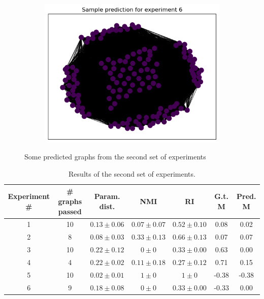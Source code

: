 \documentclass[switch, 12pt]{article}
\begin{document}
\begin{figure}[h]
\begin{subfigure}{0.28\linewidth}
        \includegraphics[width=\linewidth]{figures/exp6_pred.png}
    \end{subfigure}
    \hfill
    \caption{Some predicted graphs from the second set of experiments}
    \label{fig:pred_graphs}
\end{figure}

\begin{table}[h]
    \centering
    \setlength\heavyrulewidth{0.25ex}
    \begin{tabular}{@{}ccccccc@{}}
        \toprule
        Experiment \# & \# graphs passed        & Param. dist.                         & NMI             & RI               & G.t. M & Pred. M \\ \midrule
        1             & \multicolumn{1}{c|}{10} & \multicolumn{1}{c|}{$0.13 \pm 0.06$} & $0.07 \pm 0.07$ & $0.52 \pm  0.10$ & 0.08   & 0.02    \\
        2             & \multicolumn{1}{c|}{8}  & \multicolumn{1}{c|}{$0.08 \pm 0.03$} & $0.33 \pm 0.13$ & $0.66 \pm 0.13$  & 0.07   & 0.07    \\
        3             & \multicolumn{1}{c|}{10} & \multicolumn{1}{c|}{$0.22 \pm 0.12$} & $0 \pm 0$       & $0.33 \pm 0.00$  & 0.63   & 0.00    \\
        4             & \multicolumn{1}{c|}{4}  & \multicolumn{1}{c|}{$0.22 \pm 0.02$} & $0.11 \pm 0.18$ & $0.27 \pm 0.12$  & 0.71   & 0.15    \\
        5             & \multicolumn{1}{c|}{10} & \multicolumn{1}{c|}{$0.02 \pm 0.01$} & $1 \pm 0$       & $1 \pm 0$        & -0.38  & -0.38   \\
        6             & \multicolumn{1}{c|}{9}  & \multicolumn{1}{c|}{$0.18 \pm 0.08$} & $0 \pm 0$       & $0.33 \pm 0.00$  & -0.33  & 0.00    \\ \bottomrule
    \end{tabular}
    \caption{Results of the second set of experiments.}
    \label{tab:sbm_results}
\end{table}
\end{document}
